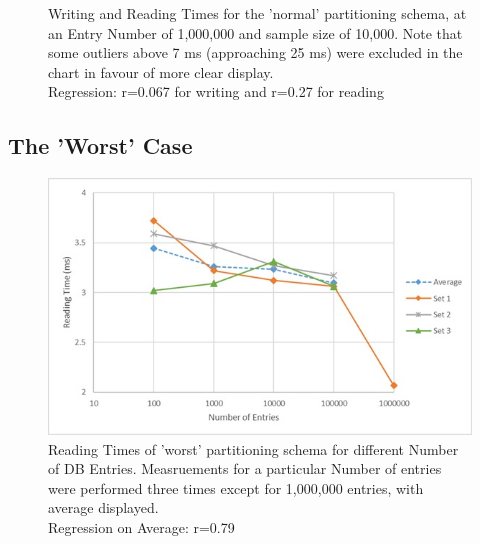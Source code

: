 \documentclass{template/csfourzero}
\begin{document}
  \begin{figure}[H]
      \centering
      \noindent{}
      \caption{Writing and Reading Times for the 'normal' partitioning schema, at an Entry Number of 1,000,000 and sample size of 10,000. Note that some outliers above 7 ms (approaching 25 ms) were excluded in the chart in favour of more clear display.
      \\
      Regression: r=0.067 for writing and r=0.27 for reading}
      \label{fig:normalFull}
  \end{figure}
  
  \subsection{The 'Worst' Case}
  
  \begin{figure}[H]
      \centering
      \includegraphics{figures/worstTimes.jpg}
      \caption{Reading Times of 'worst' partitioning schema for different Number of DB Entries. Measruements for a particular Number of entries were performed three times except for 1,000,000 entries, with average displayed.
      \\
      Regression on Average: r=0.79}
      \label{fig:worstTimes}
  \end{figure}
  
\end{document}
